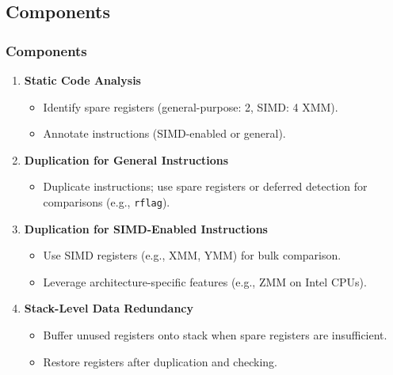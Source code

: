 \documentclass[
	12pt, %
]{beamer}
\begin{document}
\subsection{Components}
\begin{frame}
	\frametitle{Components}
	\begin{enumerate}
		\item \textbf{Static Code Analysis}
		\begin{itemize}
			\item Identify spare registers (general-purpose: 2, SIMD: 4 XMM).
			\item Annotate instructions (SIMD-enabled or general).	
		\end{itemize}
		
		\item \textbf{Duplication for General Instructions}
		\begin{itemize}
			\item Duplicate instructions; use spare registers or deferred detection for comparisons (e.g., \texttt{rflag}).
		\end{itemize}
		
		\item \textbf{Duplication for SIMD-Enabled Instructions}
		\begin{itemize}
			\item Use SIMD registers (e.g., XMM, YMM) for bulk comparison.
			
			\item Leverage architecture-specific features (e.g., ZMM on Intel CPUs).
		\end{itemize}
		
		
		\item \textbf{Stack-Level Data Redundancy}
		\begin{itemize}
			\item Buffer unused registers onto stack when spare registers are insufficient.
			\item Restore registers after duplication and checking.
		\end{itemize}
		
		
		
	\end{enumerate}
\end{frame}
\end{document}
